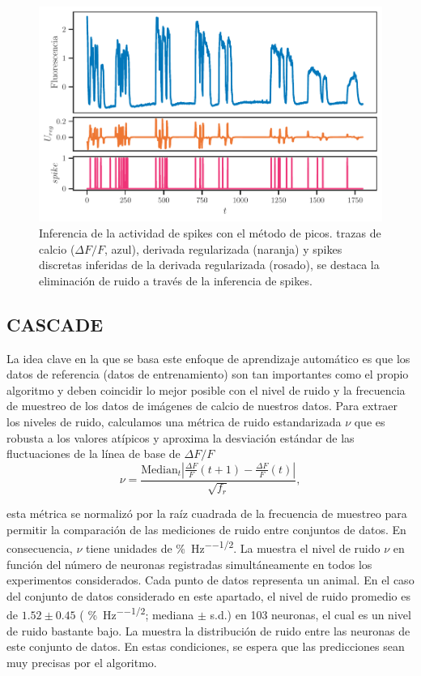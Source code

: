 \begin{figure}[h!]
	\centering{}\includegraphics[width=\imsize]{kaplan_derivada.pdf}
	\caption[Inferencia de la actividad de spikes con el método de picos.]{Inferencia de la actividad de spikes con el método de picos.  trazas de calcio ($\Delta F/F$, azul), derivada regularizada (naranja) y spikes discretas inferidas de la derivada regularizada (rosado), se  destaca la eliminación de ruido a través de la inferencia de spikes.}\label{f:resultado_picos}  
\end{figure}




\subsection{CASCADE}

La idea clave en la que se basa este enfoque  de aprendizaje automático es que los datos de referencia (datos de entrenamiento) son tan importantes como el propio algoritmo y deben coincidir lo mejor posible con el nivel de ruido y la frecuencia de muestreo de los datos de imágenes de calcio de nuestros datos.  Para extraer los niveles de ruido, calculamos una métrica de ruido estandarizada $\nu$ que es robusta a los valores atípicos y aproxima la desviación estándar de las fluctuaciones de la línea de base de $\Delta F/F$
\begin{equation}
\nu = \frac{\text{Median}_t\left| \frac{\Delta F}{F}(t+1)-\frac{\Delta F}{F}(t) \right| }{\sqrt{f_r}},
\end{equation}

esta métrica se normalizó por la raíz cuadrada de la frecuencia de muestreo para permitir la comparación de las mediciones de ruido entre conjuntos de datos. En consecuencia, $\nu$ tiene unidades de  \unit{\percent \per\hertz^{-1/2}}.   La  muestra  el nivel de ruido $\nu$ en función del número de neuronas registradas simultáneamente en todos los experimentos considerados. Cada punto de datos representa un animal.  En el caso del conjunto de datos considerado en este apartado, el  nivel de ruido  promedio es de $1.52\pm0.45$  ( \unit{\percent \per\hertz^{-1/2}}; mediana $\pm$ s.d.) en 103 neuronas, el cual es un nivel de ruido bastante bajo. La   muestra la distribución de ruido entre las neuronas de este conjunto de datos. En estas condiciones, se espera que las predicciones sean muy precisas por el algoritmo. 


